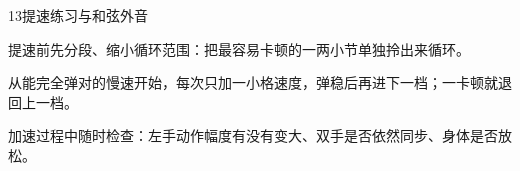 \begin{lessoncard}{13}{提速练习与和弦外音}
\begin{fignote}
\begin{center}
\end{center}
\begin{fignotes}
\item 提速前先分段、缩小循环范围：把最容易卡顿的一两小节单独拎出来循环。
\item 从能完全弹对的慢速开始，每次只加一小格速度，弹稳后再进下一档；一卡顿就退回上一档。
\item 加速过程中随时检查：左手动作幅度有没有变大、双手是否依然同步、身体是否放松。
\end{fignotes}
\end{fignote}
\end{lessoncard}

